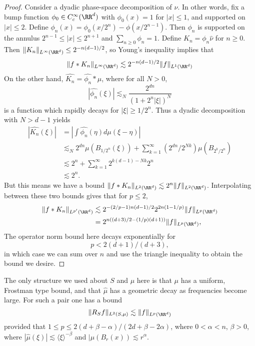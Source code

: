 \begin{proof}
  Consider a dyadic phase-space decomposition of $\nu$. In other words, fix a bump function $\phi_0 \in C_c^\infty(\RR^d)$ with $\phi_0(x) = 1$ for $|x| \leq 1$, and supported on $|x| \leq 2$. Define $\phi_n(x) = \phi_0(x/2^n) - \phi(x/2^{n-1})$. Then $\phi_n$ is supported on the annulus $2^{n-1} \leq |x| \leq 2^{n+1}$ and $\sum_{n \geq 0} \phi_n = 1$. Define $K_n = \phi_n \widehat{\nu}$ for $n \geq 0$. Then $\| K_n \|_{L^\infty(\RR^d)} \leq 2^{-n(d-1)/2}$, so Young's inequality implies that
  \[ \| f * K_n \|_{L^\infty(\RR^d)} \lesssim 2^{-n(d-1)/2} \| f \|_{L^1(\RR^d)} \]
  On the other hand, $\widehat{K_n} = \widehat{\phi_n} * \mu$, where for all $N > 0$,
  \[ |\widehat{\phi_n}(\xi)| \lesssim_N \frac{2^{dn}}{(1 + 2^n |\xi|)^N} \]
  is a function which rapidly decays for $|\xi| \geq 1/2^n$. Thus a dyadic decomposition with $N > d - 1$ yields
  \begin{align*}
    |\widehat{K_n}(\xi)| &= \left| \int \widehat{\phi_n}(\eta) d\mu(\xi - \eta) \right|\\
    &\lesssim_N 2^{dn} \mu(B_{1/2^n}(\xi)) + \sum_{k = 1}^\infty (2^{dn} / 2^{Nk}) \mu(B_{2^k/2^n})\\
    &\lesssim 2^n + \sum_{k = 1}^\infty 2^{k(d-1)-Nk} 2^n\\
    &\lesssim 2^n.
  \end{align*}
  But this means we have a bound $\| f * K_n \|_{L^2(\RR^d)} \lesssim 2^n \| f \|_{L^2(\RR^d)}$. Interpolating between these two bounds gives that for $p \leq 2$,
  \begin{align*}
    \| f * K_n \|_{L^{p'}(\RR^d)} &\lesssim 2^{-(2/p - 1)n(d-1)/2} 2^{2n(1-1/p)} \| f \|_{L^p(\RR^d)}\\
    &= 2^{n((d+3)/2 - (1/p)(d+1))} \| f \|_{L^p(\RR^d)},
  \end{align*}
  The operator norm bound here decays exponentially for
  \[ p < 2(d+1)/(d+3), \]
  in which case we can sum over $n$ and use the triangle inequality to obtain the bound we desire.
\end{proof}

\begin{remark}
  The only structure we used about $S$ and $\mu$ here is that $\mu$ has a uniform, Frostman type bound, and that $\widehat{\mu}$ has a geometric decay as frequencies become large. For such a pair one has a bound
  \[ \| R_S f \|_{L^2(S,\mu)} \lesssim \| f \|_{L^p(\RR^d)} \]
  provided that $1 \leq p \leq 2(d + \beta - \alpha)/(2d + \beta - 2\alpha)$, where $0 < \alpha < n$, $\beta > 0$, where $|\widehat{\mu}(\xi)| \lesssim \langle \xi \rangle^{-\beta}$ and $|\mu(B_r(x)) \lesssim r^\alpha$.
\end{remark}

